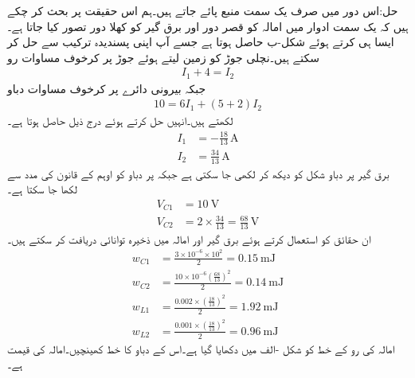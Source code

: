 حل:اس دور میں صرف یک سمت منبع پائے جاتے ہیں۔ہم اس حقیقت پر بحث کر چکے ہیں کہ یک سمت ادوار میں امالہ کو قصر دور اور برق گیر کو کھلا دور تصور کیا جاتا ہے۔ایسا ہی کرتے ہوئے  شکل-ب حاصل ہوتا ہے جسے آپ اپنی پسندیدہ  ترکیب سے حل کر سکتے ہیں۔نچلی جوڑ کو زمین لیتے ہوئے جوڑ  پر کرخوف مساوات رو
\begin{align*}
I_1+4=I_2
\end{align*} 
جبکہ بیرونی دائرے پر کرخوف مساوات دباو
\begin{align*}
10=6I_1+(5+2)I_2
\end{align*}
 لکھتے ہیں۔انہیں حل کرتے ہوئے درج ذیل حاصل ہوتا ہے۔
\begin{align*}
I_1&=-\frac{18}{13}\, \si{\ampere}\\
I_2&=\frac{34}{13}\,\si{\ampere}
\end{align*}
برق گیر  پر دباو شکل کو دیکھ کر لکھی جا سکتی ہے  جبکہ   پر دباو کو اوہم کے قانون کی مدد سے لکھا جا سکتا ہے۔
\begin{align*}
V_{C1}&=\SI{10}{\volt}\\
V_{C2}&=2 \times \frac{34}{13}=\frac{68}{13}\,\si{\volt}
\end{align*}
ان حقائق کو استعمال کرتے ہوئے برق گیر اور امالہ میں ذخیرہ توانائی دریافت کر سکتے ہیں۔
\begin{align*}
w_{C1}&=\frac{3\times 10^{-6} \times 10^2}{2}=\SI{0.15}{\milli\joule}\\
w_{C2}&=\frac{10 \times 10^{-6} \left(\frac{68}{13}\right)^2}{2}=\SI{0.14}{\milli\joule}\\
w_{L1}&=\frac{0.002\times \left(\frac{18}{13}\right)^2 }{2}=\SI{1.92}{\milli\joule}\\
w_{L2}&=\frac{0.001\times \left(\frac{18}{13}\right)^2}{2}=\SI{0.96}{\milli\joule}
\end{align*}
امالہ کی رو کے خط کو شکل -الف میں دکھایا گیا ہے۔اس کے دباو کا خط کھینچیں۔امالہ کی قیمت  ہے۔

